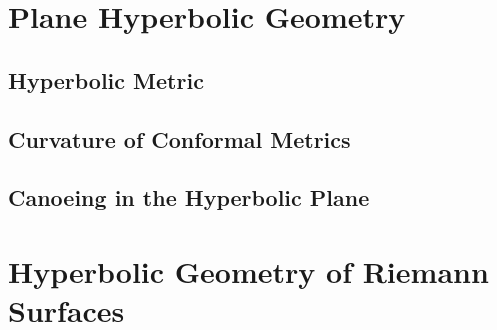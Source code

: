 \documentclass[Total.tex]{subfiles}
\begin{document}
	\chapter{Plane Hyperbolic Geometry}
		\section{Hyperbolic Metric}
		\section{Curvature of Conformal Metrics}
		\section{Canoeing in the Hyperbolic Plane}
	\chapter{Hyperbolic Geometry of Riemann Surfaces}
\end{document}
